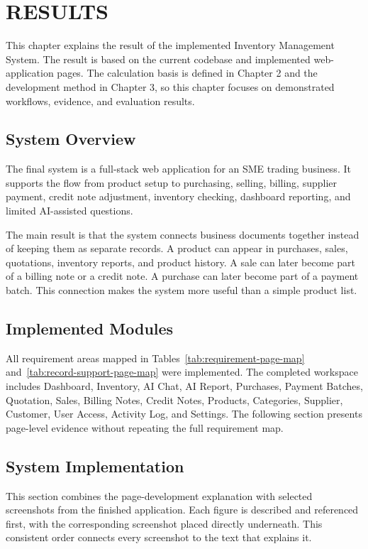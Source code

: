 \chapter{RESULTS}

This chapter explains the result of the implemented Inventory Management System. The result is based on the current codebase and implemented web-application pages. The calculation basis is defined in Chapter 2 and the development method in Chapter 3, so this chapter focuses on demonstrated workflows, evidence, and evaluation results.

\section{System Overview}
The final system is a full-stack web application for an SME trading business. It supports the flow from product setup to purchasing, selling, billing, supplier payment, credit note adjustment, inventory checking, dashboard reporting, and limited AI-assisted questions.

The main result is that the system connects business documents together instead of keeping them as separate records. A product can appear in purchases, sales, quotations, inventory reports, and product history. A sale can later become part of a billing note or a credit note. A purchase can later become part of a payment batch. This connection makes the system more useful than a simple product list.

\section{Implemented Modules}
All requirement areas mapped in Tables~\ref{tab:requirement-page-map} and~\ref{tab:record-support-page-map} were implemented. The completed workspace includes Dashboard, Inventory, AI Chat, AI Report, Purchases, Payment Batches, Quotation, Sales, Billing Notes, Credit Notes, Products, Categories, Supplier, Customer, User Access, Activity Log, and Settings. The following section presents page-level evidence without repeating the full requirement map.

\section{System Implementation}
This section combines the page-development explanation with selected screenshots from the finished application. Each figure is described and referenced first, with the corresponding screenshot placed directly underneath. This consistent order connects every screenshot to the text that explains it.

